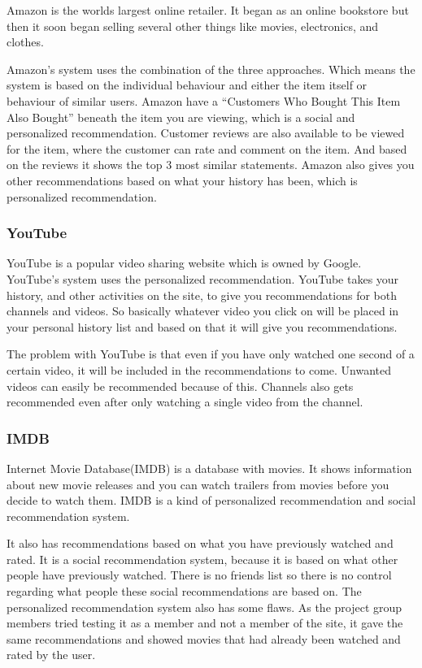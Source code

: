 Amazon is the worlds largest online retailer. It began as an online bookstore but then it soon began selling several other things like movies, electronics, and clothes.

Amazon's system uses the combination of the three approaches. Which means the system is based on the individual behaviour and either the item itself or behaviour of similar users. Amazon have a “Customers Who Bought This Item Also Bought” beneath the item you are viewing, which is a social and personalized recommendation. Customer reviews are also available to be viewed for the item, where the customer can rate and comment on the item. And based on the reviews it shows the top 3 most similar statements. Amazon also gives you other recommendations based on what your history has been, which is personalized recommendation.

\subsubsection{YouTube}

YouTube is a popular video sharing website which is owned by Google. YouTube's system uses the personalized recommendation. YouTube takes your history, and other activities on the site, to give you recommendations for both channels and videos. So basically whatever video you click on will be placed in your personal history list and based on that it will give you recommendations.

The problem with YouTube is that even if you have only watched one second of a certain video, it will be included in the recommendations to come. Unwanted videos can easily be recommended because of this. Channels also gets recommended even after only watching a single video from the channel.

\subsubsection{IMDB}

Internet Movie Database(IMDB) is a database with movies. It shows information about new movie releases and you can watch trailers from movies before you decide to watch them. IMDB is a kind of  personalized recommendation and social recommendation system. 

It also has recommendations based on what you have previously watched and rated. It is a social recommendation system, because it is based on what other people have previously watched. There is no friends list so there is no control regarding what people these social recommendations are based on. The personalized recommendation system also has some flaws. As the project group members tried testing it as a member and not a member of the site, it gave the same recommendations and showed movies that had already been watched and rated by the user.

